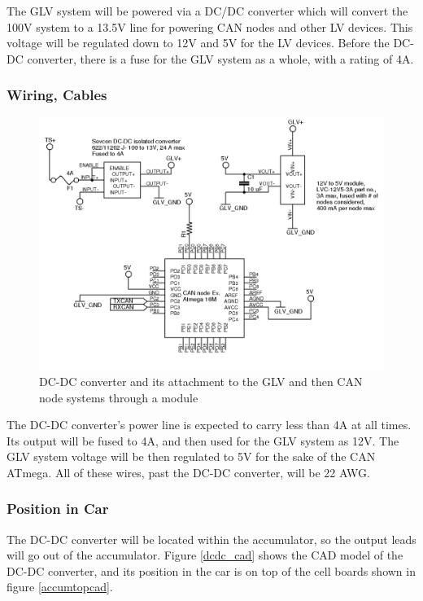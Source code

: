 \documentclass{article}
\begin{document}
            The GLV system will be powered via a DC/DC converter which will convert the 100V system to a 13.5V line for powering CAN nodes and other LV devices. This voltage will be regulated down to 12V and 5V for the LV devices. Before the DC-DC converter, there is a fuse for the GLV system as a whole, with a rating of 4A.

        \subsubsection{Wiring, Cables}

            \begin{figure}[H]
                \centering
                \includegraphics{CANnodepower}
                \caption{DC-DC converter and its attachment to the GLV and then CAN node systems through a module}
                \label{dc-dcglv}
            \end{figure}

            The DC-DC converter's power line is expected to carry less than 4A at all times. Its output will be fused to 4A, and then used for the GLV system as 12V. The GLV system voltage will be then regulated to 5V for the sake of the CAN ATmega. All of these wires, past the DC-DC converter, will be 22 AWG.

        \subsubsection{Position in Car}

            The DC-DC converter will be located within the accumulator, so the output leads will go out of the accumulator. Figure \ref{dcdc_cad} shows the CAD model of the DC-DC converter, and its position in the car is on top of the cell boards shown in figure \ref{accumtopcad}.
\end{document}
